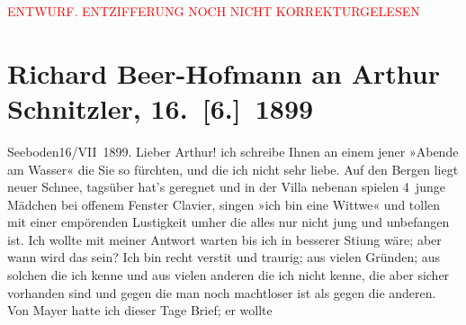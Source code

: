 
\begin{center}
            \textcolor{red}{ENTWURF. ENTZIFFERUNG NOCH NICHT KORREKTURGELESEN}
                      \end{center}
            
               \section[Richard Beer-Hofmann an Arthur Schnitzler, 16. {[}6.{]} 1899]{ Richard Beer-Hofmann an Arthur Schnitzler,
               16. {[}6.{]} 1899}\nopagebreak{}\rehead{ }\begin{ledgroupsized}[t]{13cm}\normalsize\beginnumbering{} \toendnotes[C]{\smallbreak\pagebreak[2]} 
\toendnotes[C]{\smallbreak}\pstart
           \raggedleft{}{\pb}Seeboden16/VII 1899.\pend
           \pstart
           Lieber Arthur! ich schreibe Ihnen an einem jener »Abende am Wasser«
               die Sie so fürchten, und die ich nicht sehr liebe. Auf den Bergen liegt neuer Schnee,
               tagsüber hat’s geregnet und in der Villa nebenan spielen 4 junge Mäd{\pb}chen bei offenem Fenster Clavier,
               singen »ich bin eine Wittwe« und tollen mit einer
               empörenden Lustigkeit umher die alles nur nicht jung und unbefangen ist.\pend
           \pstart
           Ich wollte mit meiner Antwort warten bis ich in besserer Sti{\geminationm}ung wäre; aber wann {\pb}wird das sein? Ich bin recht
                  versti{\geminationm}t und traurig; aus vielen Gründen; aus solchen
                   die ich kenne und aus vielen anderen die ich
               nicht kenne, die aber sicher vorhanden sind und gegen die man noch machtloser {\pb}ist als gegen die anderen. Von Mayer hatte ich dieser Tage Brief; er wollte

\end{ledgroupsized}

